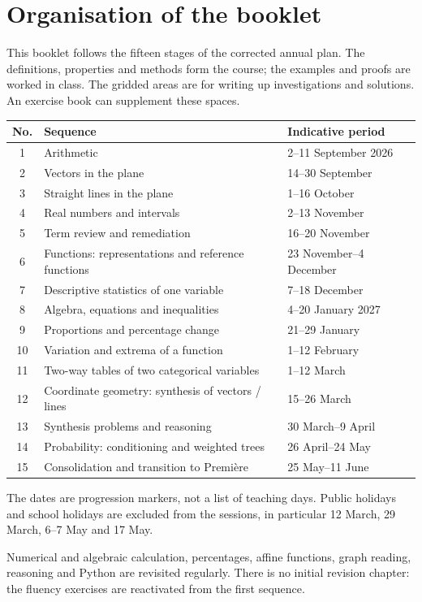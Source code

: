 \documentclass[11pt,a4paper,oneside]{article}
\newif\ifprof
\newcounter{sequence}\newcounter{exemple}[sequence]
\newcommand{\prof}[1]{\ifprof\begin{methode}[Teacher notes]#1\end{methode}\fi}
\begin{document}
\section*{Organisation of the booklet}
This booklet follows the fifteen stages of the corrected annual plan. The definitions, properties and methods form the course; the examples and proofs are worked in class. The gridded areas are for writing up investigations and solutions. An exercise book can supplement these spaces.
\begin{center}\small\renewcommand{\arraystretch}{1.25}\begin{tabularx}{\linewidth}{c X l}
\textbf{No.}&\textbf{Sequence}&\textbf{Indicative period}\\\hline
1&Arithmetic&2--11 September 2026\\
2&Vectors in the plane&14--30 September\\
3&Straight lines in the plane&1--16 October\\
4&Real numbers and intervals&2--13 November\\
5&Term review and remediation&16--20 November\\
6&Functions: representations and reference functions&23 November--4 December\\
7&Descriptive statistics of one variable&7--18 December\\
8&Algebra, equations and inequalities&4--20 January 2027\\
9&Proportions and percentage change&21--29 January\\
10&Variation and extrema of a function&1--12 February\\
11&Two-way tables of two categorical variables&1--12 March\\
12&Coordinate geometry: synthesis of vectors / lines&15--26 March\\
13&Synthesis problems and reasoning&30 March--9 April\\
14&Probability: conditioning and weighted trees&26 April--24 May\\
15&Consolidation and transition to Première&25 May--11 June\\\hline
\end{tabularx}\end{center}
The dates are progression markers, not a list of teaching days. Public holidays and school holidays are excluded from the sessions, in particular 12 March, 29 March, 6--7 May and 17 May.
\begin{cours}
Numerical and algebraic calculation, percentages, affine functions, graph reading, reasoning and Python are revisited regularly. There is no initial revision chapter: the fluency exercises are reactivated from the first sequence.
\end{cours}
\prof{The corrected DOCX plan is the reference for order and dates. Reviews 5, 12, 13 and 15 are times for reinvestment. Solutions should only be revealed after an investigation. Exercises explicitly described as fictitious are not real survey data.}
\clearpage\tableofcontents\clearpage{}\pagestyle{fancy}
\end{document}
